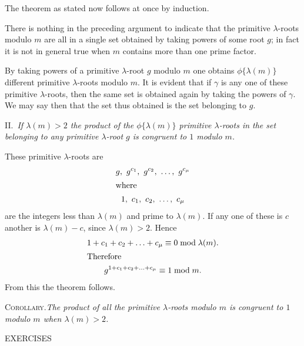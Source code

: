 \documentclass[oneside]{book}
\begin{document}
The theorem as stated now follows at once by induction.

\smallskip There is nothing in the preceding argument to indicate
that the primitive $\lambda$-roots modulo $m$ are all in a single
set obtained by taking powers of some root $g$; in fact it is not in
general true when $m$ contains more than one prime factor.

By taking powers of a primitive $\lambda$-root $g$ modulo $m$ one
obtains $\phi\{\lambda(m)\}$ different primitive $\lambda$-roots
modulo $m$. It is evident that if $\gamma$ is any one of these
primitive $\lambda$-roots, then the same set is obtained again by
taking the powers of $\gamma$. We may say then that the set thus
obtained is the set belonging to $g$.

\smallskip II.~\emph{If $\lambda(m)>2$ the product of the
$\phi\{\lambda(m)\}$ primitive $\lambda$-roots in the set belonging
to any primitive $\lambda$-root $g$ is congruent to $1$ modulo $m$.}

These primitive $\lambda$-roots are
\begin{gather*}
g,\ g^{c_1},\ g^{c_2},\ \ldots,\ g^{c_\mu} \\
\intertext{where}
1,\ c_1,\ c_2,\ \ldots,\ c_\mu \\
\end{gather*}
are the integers less than $\lambda(m)$ and prime to $\lambda(m)$.
If any one of these is $c$ another is $\lambda(m)-c$, since
$\lambda(m) > 2$. Hence
\begin{gather*}
1 + c_1 + c_2 + \ldots + c_\mu \equiv 0 \bmod \lambda(m). \\
\intertext{Therefore}
g^{1 + c_1 + c_2 + \ldots + c_\mu} \equiv 1 \bmod m.
\end{gather*}
From this the theorem follows.

\smallskip \textsc{Corollary.}\emph{The product of all the
primitive $\lambda$-roots modulo $m$ is congruent to $1$ modulo $m$
when $\lambda(m) > 2$.}

\begin{center}
EXERCISES
\end{center}
\end{document}

